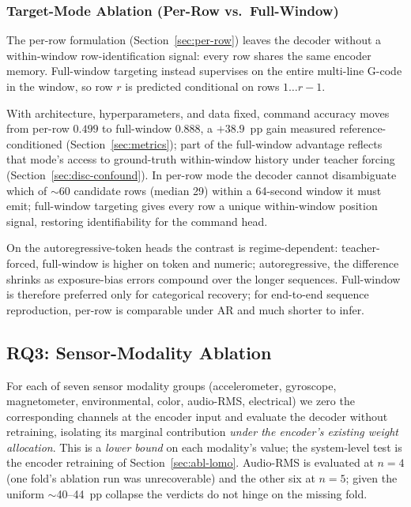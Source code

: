 \documentclass[sensors,article,submit,moreauthors,pdftex]{Definitions/mdpi}
\begin{document}
\subsubsection{Target-Mode Ablation (Per-Row vs.\ Full-Window)}
\label{sec:abl-target-mode}

The per-row formulation (Section~\ref{sec:per-row}) leaves the decoder without a within-window row-identification signal: every row shares the same encoder memory. Full-window targeting instead supervises on the entire multi-line G-code in the window, so row $r$ is predicted conditional on rows $1\!\dots\!r-1$.

With architecture, hyperparameters, and data fixed, command accuracy moves from per-row $0.499$ to full-window $0.888$, a $+38.9$~pp gain measured reference-conditioned (Section~\ref{sec:metrics}); part of the full-window advantage reflects that mode's access to ground-truth within-window history under teacher forcing (Section~\ref{sec:disc-confound}). In per-row mode the decoder cannot disambiguate which of $\sim$60 candidate rows (median 29) within a 64-second window it must emit; full-window targeting gives every row a unique within-window position signal, restoring identifiability for the command head.

On the autoregressive-token heads the contrast is regime-dependent: teacher-forced, full-window is higher on token and numeric; autoregressive, the difference shrinks as exposure-bias errors compound over the longer sequences. Full-window is therefore preferred only for categorical recovery; for end-to-end sequence reproduction, per-row is comparable under AR and much shorter to infer.

\subsection{RQ3: Sensor-Modality Ablation}
\label{sec:abl-sensors}

For each of seven sensor modality groups (accelerometer, gyroscope, magnetometer, environmental, color, audio-RMS, electrical) we zero the corresponding channels at the encoder input and evaluate the decoder without retraining, isolating its marginal contribution \emph{under the encoder's existing weight allocation}. This is a \emph{lower bound} on each modality's value; the system-level test is the encoder retraining of Section~\ref{sec:abl-lomo}. Audio-RMS is evaluated at $n=4$ (one fold's ablation run was unrecoverable) and the other six at $n=5$; given the uniform $\sim$40--44~pp collapse the verdicts do not hinge on the missing fold.
\end{document}
